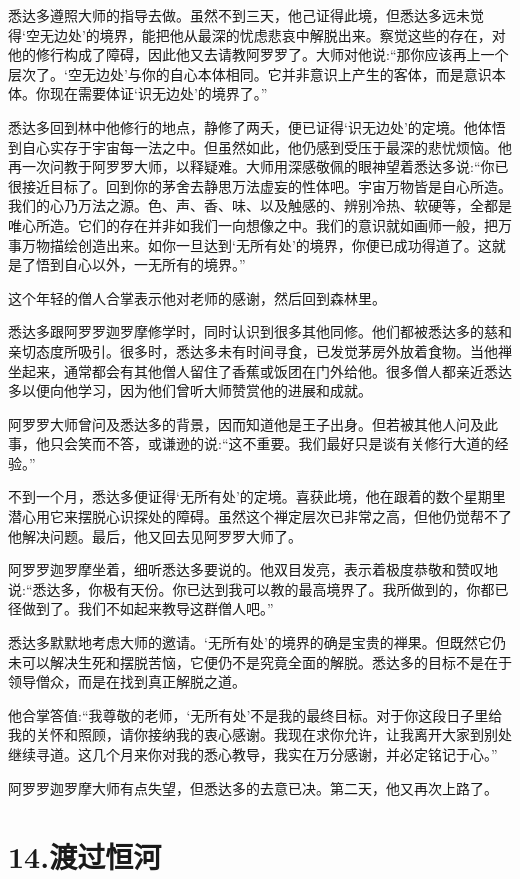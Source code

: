 \documentclass[12pt,twoside,openany]{book}
\begin{document}
悉达多遵照大师的指导去做。虽然不到三天，他己证得此境，但悉达多远未觉得‘空无边处’的境界，能把他从最深的忧虑悲哀中解脱出来。察觉这些的存在，对他的修行构成了障碍，因此他又去请教阿罗罗了。大师对他说:“那你应该再上一个层次了。‘空无边处’与你的自心本体相同。它并非意识上产生的客体，而是意识本体。你现在需要体证‘识无边处’的境界了。”

悉达多回到林中他修行的地点，静修了两夭，便已证得‘识无边处’的定境。他体悟到自心实存于宇宙每一法之中。但虽然如此，他仍感到受压于最深的悲忧烦恼。他再一次问教于阿罗罗大师，以释疑难。大师用深感敬佩的眼神望着悉达多说:“你已很接近目标了。回到你的茅舍去静思万法虚妄的性体吧。宇宙万物皆是自心所造。我们的心乃万法之源。色、声、香、味、以及触感的、辨别冷热、软硬等，全都是唯心所造。它们的存在并非如我们一向想像之中。我们的意识就如画师一般，把万事万物描绘创造出来。如你一旦达到‘无所有处’的境界，你便已成功得道了。这就是了悟到自心以外，一无所有的境界。”

这个年轻的僧人合掌表示他对老师的感谢，然后回到森林里。

悉达多跟阿罗罗迦罗摩修学时，同时认识到很多其他同修。他们都被悉达多的慈和亲切态度所吸引。很多时，悉达多未有时间寻食，已发觉茅房外放着食物。当他禅坐起来，通常都会有其他僧人留住了香蕉或饭团在门外给他。很多僧人都亲近悉达多以便向他学习，因为他们曾听大师赞赏他的进展和成就。

阿罗罗大师曾问及悉达多的背景，因而知道他是王子出身。但若被其他人问及此事，他只会笑而不答，或谦逊的说:“这不重要。我们最好只是谈有关修行大道的经验。”

不到一个月，悉达多便证得‘无所有处’的定境。喜获此境，他在跟着的数个星期里潜心用它来摆脱心识探处的障碍。虽然这个禅定层次已非常之高，但他仍觉帮不了他解决问题。最后，他又回去见阿罗罗大师了。

阿罗罗迦罗摩坐着，细听悉达多要说的。他双目发亮，表示着极度恭敬和赞叹地说:“悉达多，你极有天份。你已达到我可以教的最高境界了。我所做到的，你都已径做到了。我们不如起来教导这群僧人吧。”

悉达多默默地考虑大师的邀请。‘无所有处’的境界的确是宝贵的禅果。但既然它仍未可以解决生死和摆脱苦恼，它便仍不是究竟全面的解脱。悉达多的目标不是在于领导僧众，而是在找到真正解脱之道。

他合掌答值:“我尊敬的老师，‘无所有处’不是我的最终目标。对于你这段日子里给我的关怀和照顾，请你接纳我的衷心感谢。我现在求你允许，让我离开大家到别处继续寻道。这几个月来你对我的悉心教导，我实在万分感谢，并必定铭记于心。”

阿罗罗迦罗摩大师有点失望，但悉达多的去意已决。第二天，他又再次上路了。

\chapter{14.渡过恒河}\label{ch14}
\end{document}
